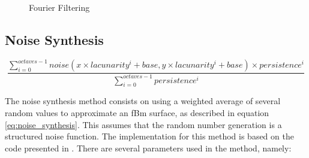     
    \begin{figure}[!h]
    	\begin{center}
    	\end{center}
    	\caption{Fourier Filtering}
    	\label{fig:fourier_filtering}
    \end{figure}		
  
  \subsection{Noise Synthesis} \label{sec:methodology:noise}
  
	\begin{equation}
		\frac{\sum\limits_{i = 0}^{octaves - 1} noise(x \times lacunarity^i + base, y \times lacunarity^i + base) \times persistence^i}{ \sum\limits_{i = 0}^{octaves - 1} persistence^i}
		\label{eq:noise_synthesis}
	\end{equation}
	\myequation{}
  
    The noise synthesis method consists on using a weighted average of several random values to approximate an fBm surface, as described in equation \ref{eq:noise_synthesis}. This assumes that the random number generation is a structured noise function. The implementation for this method is based on the code presented in \cite{Musgrave1993}. There are several parameters used in the method, namely:
    
